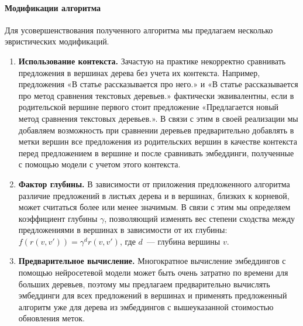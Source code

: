 \documentclass[12pt]{article}
\begin{document}
\paragraph{Модификации алгоритма}
Для усовершенствования полученного алгоритма мы предлагаем несколько эвристических модификаций.
\begin{enumerate}
    \item \textbf{Использование контекста.} Зачастую на практике некорректно сравнивать предложения в вершинах дерева без учета их контекста. Например, предложения «В статье рассказывается про него.» и «В статье рассказывается про метод сравнения текстовых деревьев.» фактически эквивалентны, если в родительской вершине первого стоит предложение «Предлагается новый метод сравнения текстовых деревьев.». В связи с этим в своей реализации мы добавляем возможность при сравнении деревьев предварительно добавлять в метки вершин все предложения из родительских вершин в качестве контекста перед предложением в вершине и после сравнивать эмбеддинги, полученные с помощью модели с учетом этого контекста.
    \item \textbf{Фактор глубины.} В зависимости от приложения предложенного алгоритма различие предложений в листьях дерева и в вершинах, близких к корневой, может считаться более или менее значимым. В связи с этим мы определяем коэффициент глубины $\gamma$, позволяющий изменять вес степени сходства между предложениями в вершинах в зависимости от их глубины: $f(r(v, v')) = \gamma^d r(v, v')$, где $d$~--- глубина вершины $v$.
    \item \textbf{Предварительное вычисление.} Многократное вычисление эмбеддингов с помощью нейросетевой модели может быть очень затратно по времени для больших деревьев, поэтому мы предлагаем предварительно вычислять эмбеддинги для всех предложений в вершинах и применять предложенный алгоритм уже для дерева из эмбеддингов с вышеуказанной стоимостью обновления меток.
\end{enumerate}
\end{document}
